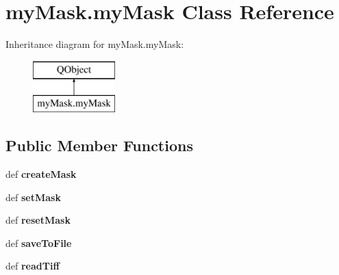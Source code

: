 \hypertarget{classmyMask_1_1myMask}{\section{my\-Mask.\-my\-Mask Class Reference}
\label{classmyMask_1_1myMask}
}
Inheritance diagram for my\-Mask.\-my\-Mask\-:\begin{figure}[H]
\begin{center}
\leavevmode
\includegraphics[height=2.000000cm]{classmyMask_1_1myMask}
\end{center}
\end{figure}
\subsection*{Public Member Functions}
\begin{DoxyCompactItemize}
\item 
\hypertarget{classmyMask_1_1myMask_a551d04051af413888f60e9cf74a964fa}{def {\bfseries create\-Mask}}\label{classmyMask_1_1myMask_a551d04051af413888f60e9cf74a964fa}

\item 
\hypertarget{classmyMask_1_1myMask_a0b6e02944d05baf74d75976672b75ba3}{def {\bfseries set\-Mask}}\label{classmyMask_1_1myMask_a0b6e02944d05baf74d75976672b75ba3}

\item 
\hypertarget{classmyMask_1_1myMask_aaa9e1d93e4202095b0c5ffba2d98d53a}{def {\bfseries reset\-Mask}}\label{classmyMask_1_1myMask_aaa9e1d93e4202095b0c5ffba2d98d53a}

\item 
\hypertarget{classmyMask_1_1myMask_a1b17be401eb92b7293e40de411f8b17f}{def {\bfseries save\-To\-File}}\label{classmyMask_1_1myMask_a1b17be401eb92b7293e40de411f8b17f}

\item 
\hypertarget{classmyMask_1_1myMask_aface6241850e7cbc5bc4ae847e936eac}{def {\bfseries read\-Tiff}}\label{classmyMask_1_1myMask_aface6241850e7cbc5bc4ae847e936eac}

\end{DoxyCompactItemize}

